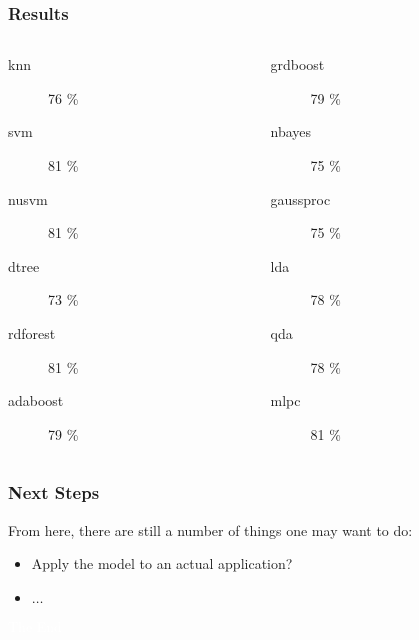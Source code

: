\documentclass{beamer}
\begin{document}
\begin{frame}
  \frametitle{Results}
  \begin{columns}
    \begin{column}{0.5\columnwidth}
      \begin{description}
      \item[knn] 76 \%
      \item[svm] 81 \%
      \item[nusvm] 81 \%
      \item[dtree] 73 \%
      \item[rdforest] 81 \%
      \item[adaboost] 79 \%
      \end{description}
    \end{column}
    \begin{column}{0.5\columnwidth}
      \begin{description}
      \item[grdboost] 79 \%
      \item[nbayes] 75 \%
      \item[gaussproc] 75 \%
      \item[lda] 78 \%
      \item[qda] 78 \%
      \item[mlpc] 81 \%
      \end{description}
    \end{column}
  \end{columns}
\end{frame}


\begin{frame}
  \frametitle{Next Steps}

  From here, there are still a number of things one may want to do:

  \begin{itemize}
  \item Apply the model to an actual application?
  \item $\ldots$
  \end{itemize}

\end{frame}


\bgroup
{}
\begin{frame}[t,plain]{}{}
  \begin{center}
    {\tiny \textcolor{white}{The End}}
  \end{center}
\end{frame}
\egroup
\end{document}
